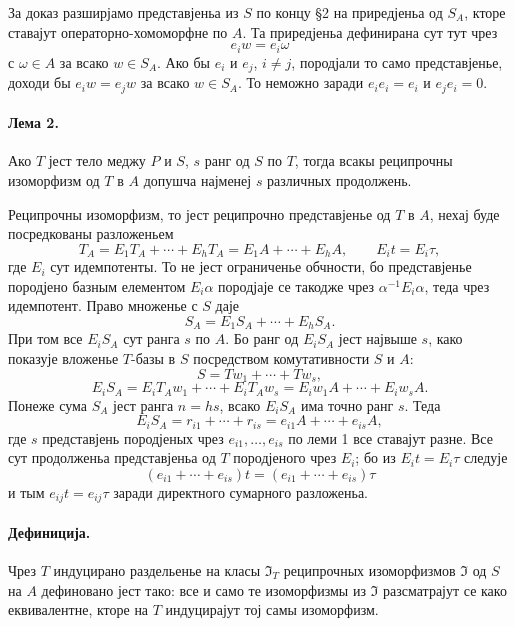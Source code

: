 ﻿\documentclass[11pt]{article}
\begin{document}
За доказ разширјамо представјеньа из \(S\) по концу §2 на приредјеньа од \(S_A\), кторе ставајут операторно-хомоморфне по \(A\). Та приредјеньа дефинирана сут тут чрез
\[
        e_i w=e_i\omega
\]
с \(\omega\in A\) за всако \(w\in S_A\). Ако бы \(e_i\) и \(e_j\), \(i\ne j\), породјали то само представјенье, доходи бы \(e_iw=e_jw\) за всако \(w\in S_A\). То неможно заради \(e_ie_i=e_i\) и \(e_je_i=0\).

\paragraph{Лема 2.}
Ако \(T\) јест тело меджу \(P\) и \(S\), \(s\) ранг од \(S\) по \(T\), тогда всакы реципрочны изоморфизм од \(T\) в \(A\) допушча најменеј \(s\) различных продолжень.

Реципрочны изоморфизм, то јест реципрочно представјенье од \(T\) в \(A\), нехај буде посредкованы разложеньем
\[
        T_A=E_1T_A+\cdots+E_hT_A
            =E_1A+\cdots+E_hA,
        \qquad E_it=E_i\tau ,
\]
где \(E_i\) сут идемпотенты. То не јест ограниченье обчности, бо представјенье породјено базным елементом \(E_i\alpha\) породјаје се такодже чрез \(\alpha^{-1}E_i\alpha\), теда чрез идемпотент. Право множенье с \(S\) даје
\[
        S_A=E_1S_A+\cdots+E_hS_A .
\]
При том все \(E_iS_A\) сут ранга \(s\) по \(A\). Бо ранг од \(E_iS_A\) јест највыше \(s\), како показује вложенье \(T\)-базы в \(S\) посредством комутативности \(S\) и \(A\):
\[
        S=Tw_1+\cdots+Tw_s,
\]
\[
        E_iS_A=E_iT_Aw_1+\cdots+E_iT_Aw_s
              =E_iw_1A+\cdots+E_iw_sA .
\]
Понеже сума \(S_A\) јест ранга \(n=hs\), всако \(E_iS_A\) има точно ранг \(s\). Теда
\[
        E_iS_A=r_{i1}+\cdots+r_{is}
              =e_{i1}A+\cdots+e_{is}A,
\]
где \(s\) представјень породјеных чрез \(e_{i1},\ldots,e_{is}\) по леми 1 все ставајут разне. Все сут продолженьа представјеньа од \(T\) породјеного чрез \(E_i\); бо из \(E_it=E_i\tau\) следује
\[
        (e_{i1}+\cdots+e_{is})t=(e_{i1}+\cdots+e_{is})\tau
\]
и тым \(e_{ij}t=e_{ij}\tau\) заради директного сумарного разложеньа.

\paragraph{Дефиниција.}
Чрез \(T\) индуцирано раздельенье на класы \(\mathfrak I_T\) реципрочных изоморфизмов \(\mathfrak I\) од \(S\) на \(A\) дефиновано јест тако: все и само те изоморфизмы из \(\mathfrak I\) разсматрајут се како еквивалентне, кторе на \(T\) индуцирајут тој самы изоморфизм.
\end{document}
